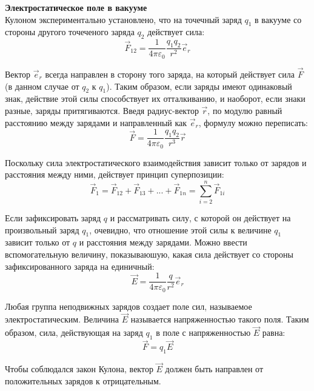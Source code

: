 \documentclass{article}
\begin{document}
	\textbf{Электростатическое поле в вакууме}\\
	
	Кулоном экспериментально установлено, что на точечный заряд $q_1$ в вакууме со стороны другого точеченого заряда $q_2$ действует сила:
	\begin{equation}
		\vec F_{12} = \frac{1}{4\pi\varepsilon_0}\frac{q_1q_2}{r^2}\vec e_{r}
	\end{equation}

	Вектор $\vec e_{r}$ всегда направлен в сторону того заряда, на который действует сила $\vec F$ (в данном случае от $q_2$ к $q_1$). Таким образом, если заряды имеют одинаковый знак, действие этой силы способствует их отталкиванию, и наоборот, если знаки разные, заряды притягиваются. Введя радиус-вектор $\vec r$, по модулю равный расстоянию между зарядами и направленный как $\vec e_{r}$, формулу можно переписать:
	\begin{equation}
		\vec F = \frac{1}{4\pi\varepsilon_0}\frac{q_1q_2}{r^3}\vec r
	\end{equation}

	Поскольку сила электростатического взаимодействия зависит только от зарядов и расстояния между ними, действует принцип суперпозиции:
	\begin{equation}
		\vec F_{1} = \vec F_{12} + \vec F_{13} + ... + \vec F_{1n} = \sum_{i=2}^n \vec F_{1i} 
	\end{equation}

	Если зафиксировать заряд $q$ и рассматривать силу, с которой он действует на произвольный заряд $q_1$, очевидно, что отношение этой силы к величине $q_1$ зависит только от $q$ и расстояния между зарядами. Можно ввести вспомогательную величину, показываюшую, какая сила действует со стороны зафиксированного заряда на единичный:
	\begin{equation}
		\vec E = \frac{1}{4\pi\varepsilon_0}\frac{q}{r^2}\vec e_r
	\end{equation}

	Любая группа неподвижных зарядов создает поле сил, называемое электростатическим. Величина $\vec E$ называется напряженностью такого поля. Таким образом, сила, действующая на заряд $q_1$ в поле с напряженностью $\vec E$ равна:
	\begin{equation}
		\vec F = q_1\vec E
	\end{equation}

	Чтобы соблюдался закон Кулона, вектор $\vec E$ должен быть направлен от положительных зарядов к отрицательным.\\
\end{document}
